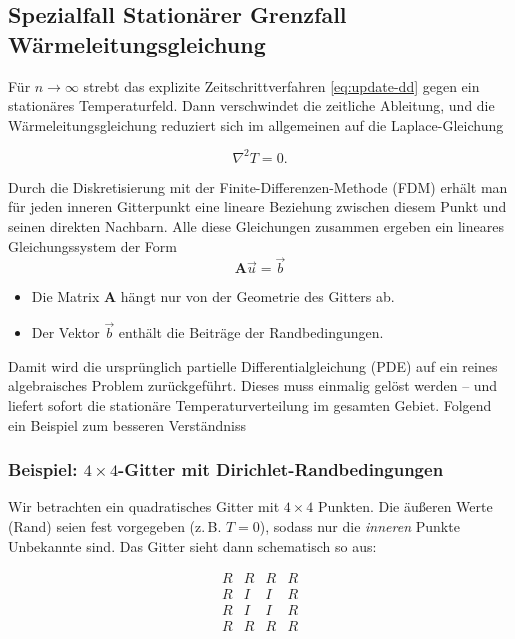 \subsection{Spezialfall Stationärer Grenzfall Wärmeleitungsgleichung}

Für $n \to \infty$ strebt das explizite Zeitschrittverfahren \eqref{eq:update-dd} gegen ein stationäres Temperaturfeld. 
Dann verschwindet die zeitliche Ableitung, und die Wärmeleitungsgleichung reduziert sich im allgemeinen auf die Laplace-Gleichung


\begin{equation}
	\nabla^2 T
	= 
	0.
\end{equation}

Durch die Diskretisierung mit der Finite-Differenzen-Methode (FDM) erhält man für jeden inneren Gitterpunkt eine lineare Beziehung zwischen diesem Punkt und seinen direkten Nachbarn.
Alle diese Gleichungen zusammen ergeben ein lineares Gleichungssystem der Form
\begin{equation}
	\mathbf{A} \vec{u}
	=
	\vec{b}
\end{equation}

\begin{itemize}
	\item Die Matrix \(\mathbf{A}\)  hängt nur von der Geometrie des Gitters ab.
	\item Der Vektor \(\vec{b}\) enthält die Beiträge der Randbedingungen.
\end{itemize}
Damit wird die ursprünglich partielle Differentialgleichung (PDE) auf ein reines algebraisches Problem zurückgeführt.
Dieses muss einmalig gelöst werden – und liefert sofort die stationäre Temperaturverteilung im gesamten Gebiet.
Folgend ein Beispiel zum besseren Verständniss

\subsubsection*{Beispiel: $4\times 4$-Gitter mit Dirichlet-Randbedingungen}

Wir betrachten ein quadratisches Gitter mit $4\times 4$ Punkten.  
Die äußeren Werte (Rand) seien fest vorgegeben (z.\,B. $T=0$), sodass nur die \emph{inneren} Punkte Unbekannte sind.  
Das Gitter sieht dann schematisch so aus:

\[
\begin{array}{cccc}
	R & R & R & R \\
	R & I & I & R \\
	R & I & I & R \\
	R & R & R & R \\
\end{array}
\]

